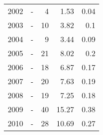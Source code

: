 \begin{longtable}{lXrrr}
        2002 & \multicolumn{1}{X}{-} & %
          \num{4} &
          \num[round-mode=places,round-precision=2]{1,53} &
          \num[round-mode=places,round-precision=2]{0,04} \\

        2003 & \multicolumn{1}{X}{-} & %
          \num{10} &
          \num[round-mode=places,round-precision=2]{3,82} &
          \num[round-mode=places,round-precision=2]{0,1} \\

        2004 & \multicolumn{1}{X}{-} & %
          \num{9} &
          \num[round-mode=places,round-precision=2]{3,44} &
          \num[round-mode=places,round-precision=2]{0,09} \\

        2005 & \multicolumn{1}{X}{-} & %
          \num{21} &
          \num[round-mode=places,round-precision=2]{8,02} &
          \num[round-mode=places,round-precision=2]{0,2} \\

        2006 & \multicolumn{1}{X}{-} & %
          \num{18} &
          \num[round-mode=places,round-precision=2]{6,87} &
          \num[round-mode=places,round-precision=2]{0,17} \\

        2007 & \multicolumn{1}{X}{-} & %
          \num{20} &
          \num[round-mode=places,round-precision=2]{7,63} &
          \num[round-mode=places,round-precision=2]{0,19} \\

        2008 & \multicolumn{1}{X}{-} & %
          \num{19} &
          \num[round-mode=places,round-precision=2]{7,25} &
          \num[round-mode=places,round-precision=2]{0,18} \\

        2009 & \multicolumn{1}{X}{-} & %
          \num{40} &
          \num[round-mode=places,round-precision=2]{15,27} &
          \num[round-mode=places,round-precision=2]{0,38} \\

        2010 & \multicolumn{1}{X}{-} & %
          \num{28} &
          \num[round-mode=places,round-precision=2]{10,69} &
          \num[round-mode=places,round-precision=2]{0,27} \\


\end{longtable}
